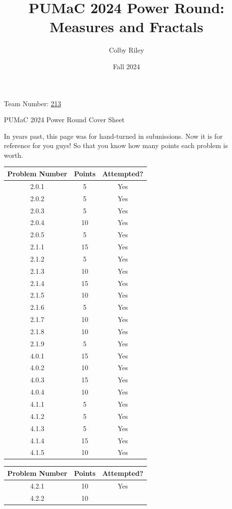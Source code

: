 \documentclass[11pt]{article}
\title{PUMaC 2024 Power Round: \\ Measures and Fractals}
\author{Colby Riley}
\date{Fall 2024}
\theoremstyle{definition}
\theoremstyle{remark}
\theoremstyle{problem}
\begin{document}
\thispagestyle{empty}
\noindent \huge{Team Number:} \underline{213\phantom{}}

\vspace{.5cm}
\noindent \huge{PUMaC 2024 Power Round Cover Sheet}

\vspace{.5cm}
\normalsize
In years past, this page was for hand-turned in submissions. Now it is for reference for you guys! So that you know how many points each problem is worth. 

\begin{center}
\begin{tabular}{|c|c|c|}\hline
Problem Number & Points & Attempted?\\\hline
2.0.1 & 5 & Yes \\\hline
2.0.2 & 5 & Yes \\\hline
2.0.3 & 5 & Yes \\\hline
2.0.4 & 10 & Yes \\\hline
2.0.5 & 5 & Yes \\\hline
2.1.1 & 15 & Yes \\\hline
2.1.2 & 5 & Yes \\\hline
2.1.3 & 10 & Yes \\\hline
2.1.4 & 15 & Yes \\\hline
2.1.5 & 10 & Yes \\\hline
2.1.6 & 5 & Yes \\\hline
2.1.7 & 10 & Yes \\\hline
2.1.8 & 10 & Yes \\\hline
2.1.9 & 5 & Yes \\\hline
4.0.1 & 15 & Yes \\\hline
4.0.2 & 10 & Yes \\\hline
4.0.3 & 15 & Yes \\\hline
4.0.4 & 10 & Yes \\\hline
4.1.1 & 5 & Yes \\\hline
4.1.2 & 5 & Yes \\\hline
4.1.3 & 5 & Yes \\\hline
4.1.4 & 15 & Yes \\\hline
4.1.5 & 10 & Yes \\\hline
\end{tabular}
\hspace{0.5 cm}
\begin{tabular}{|c|c|c|}\hline
Problem Number & Points & Attempted?\\\hline
4.2.1 & 10 & Yes \\\hline
4.2.2 & 10 & \\\hline

\end{tabular}
\end{center}
\end{document}
